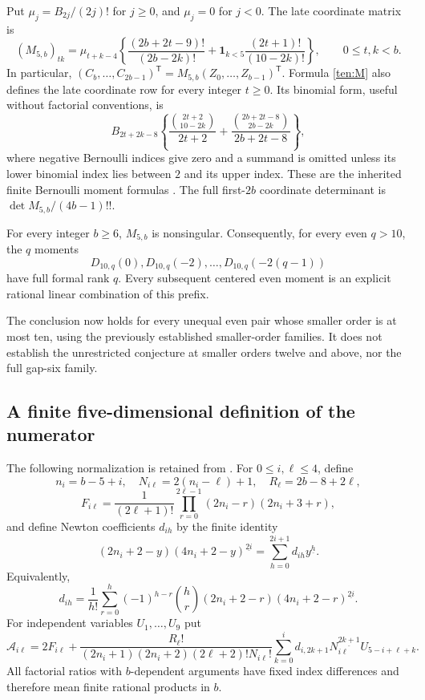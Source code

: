 Put $\mu_j=B_{2j}/(2j)!$ for $j\ge0$, and $\mu_j=0$ for $j<0$.
The late coordinate matrix is
\begin{equation}\label{ten:M}
 (M_{5,b})_{tk}=\mu_{t+k-4}
 \left\{\frac{(2b+2t-9)!}{(2b-2k)!}
 +\mathbf1_{k<5}\frac{(2t+1)!}{(10-2k)!}\right\},
 \qquad 0\le t,k<b.
\end{equation}
In particular,
$(C_b,\ldots,C_{2b-1})^{\mathsf T}
=M_{5,b}(Z_0,\ldots,Z_{b-1})^{\mathsf T}$.
Formula \eqref{ten:M} also defines the late coordinate row for
every integer $t\ge0$.  Its binomial form, useful without factorial
conventions, is
\[
 B_{2t+2k-8}\left\{
 \frac{\binom{2t+2}{10-2k}}{2t+2}
 +\frac{\binom{2b+2t-8}{2b-2k}}{2b+2t-8}\right\},
\]
where negative Bernoulli indices give zero and a summand is omitted
unless its lower binomial index lies between $2$ and its upper index.
These are the inherited finite Bernoulli moment formulas
\cite{GeneralHankel}.  The full first-$2b$ coordinate determinant is
$\det M_{5,b}/(4b-1)!!$.

\begin{theorem}\label{ten:main}
For every integer $b\ge6$, $M_{5,b}$ is nonsingular.  Consequently,
for every even $q>10$, the $q$ moments
\[
 D_{10,q}(0),D_{10,q}(-2),\ldots,D_{10,q}(-2(q-1))
\]
have full formal rank $q$.  Every subsequent centered even moment
is an explicit rational linear combination of this prefix.
\end{theorem}

The conclusion now holds for every unequal even pair whose smaller
order is at most ten, using the previously established smaller-order
families.  It does not establish the unrestricted conjecture at
smaller orders twelve and above, nor the full gap-six family.

\subsection{A finite five-dimensional definition of the numerator}

The following normalization is retained from \cite{AlternatingIncoming}.
For $0\le i,\ell\le4$, define
\[
 n_i=b-5+i,\quad N_{i\ell}=2(n_i-\ell)+1,
 \quad R_\ell=2b-8+2\ell,
\]
\[
 F_{i\ell}=\frac1{(2\ell+1)!}
       \prod_{r=0}^{2\ell-1}(2n_i-r)(2n_i+3+r),
\]
and define Newton coefficients $d_{ih}$ by the finite identity
\begin{equation}\label{ten:Newton}
 (2n_i+2-y)(4n_i+2-y)^{\underline{2i}}
       =\sum_{h=0}^{2i+1}d_{ih}y^{\underline h}.
\end{equation}
Equivalently,
\[
 d_{ih}=\frac1{h!}\sum_{r=0}^{h}(-1)^{h-r}\binom hr
       (2n_i+2-r)(4n_i+2-r)^{\underline{2i}}.
\]
For independent variables $U_1,\ldots,U_9$ put
\begin{equation}\label{ten:calA}
 \mathcal A_{i\ell}=2F_{i\ell}+
 \frac{R_\ell!}{(2n_i+1)(2n_i+2)(2\ell+2)!N_{i\ell}!}
 \sum_{k=0}^{i}d_{i,2k+1}N_{i\ell}^{\underline{2k+1}}
                 U_{5-i+\ell+k}.
\end{equation}
All factorial ratios with $b$-dependent arguments have fixed index
differences and therefore mean finite rational products in $b$.

